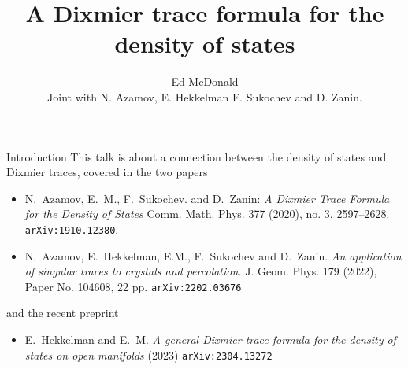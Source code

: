 \documentclass{beamer}
\newcommand\makebeamertitle{\frame{\maketitle}}%
\numberwithin{equation}{section}
\theoremstyle{plain}
\theoremstyle{plain}
\theoremstyle{definition}
\theoremstyle{plain}
\theoremstyle{plain}
\theoremstyle{definition}
\newcommand{\tr}{{\rm Tr}}
\newcommand{\Vol}{\mathrm{Vol}}
\newcommand{\Rl}{\mathbb{R}}
\begin{document}
\title[A Dixmier trace formula for the DOS]{A Dixmier trace formula for the density of states}


\author[E. McDonald]{Ed McDonald\\
Joint with N. Azamov, E. Hekkelman F. Sukochev and D. Zanin.}



\makebeamertitle


\begin{frame}{Introduction}
This talk is about a connection between the density of states and Dixmier traces, covered in the two papers
\begin{itemize}
\item{} N.~Azamov, E.~M., F.~Sukochev. and D.~Zanin: \emph{A Dixmier Trace Formula for the Density of States} Comm. Math. Phys. 377 (2020), no. 3, 2597–2628.  \texttt{arXiv:1910.12380}.
\item{} N.~Azamov, E.~Hekkelman, E.M., F.~Sukochev and D.~Zanin. \emph{An application of singular traces to crystals and percolation.} J. Geom. Phys. 179 (2022), Paper No. 104608, 22 pp. \texttt{arXiv:2202.03676}
\end{itemize}
and the recent preprint
\begin{itemize}
\item{} E.~Hekkelman and E.~M. \emph{A general Dixmier trace formula for the density of states on open manifolds} (2023) \texttt{arXiv:2304.13272}
\end{itemize}

% 
% 
% 

% 

\end{frame}
\end{document}
